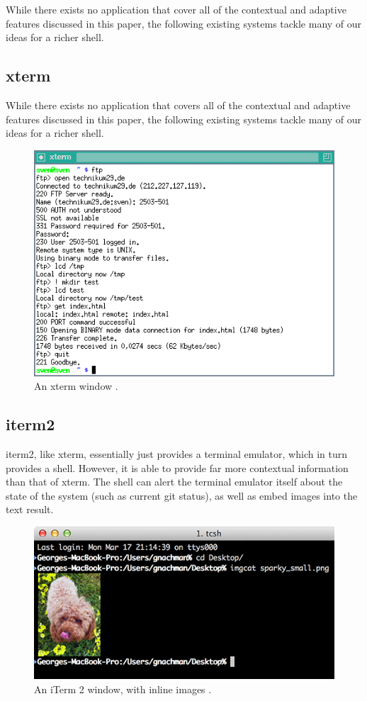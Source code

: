 While there exists no application that cover all of the contextual and adaptive
features discussed in this paper, the following existing systems tackle many of
our ideas for a richer shell.

\subsection{xterm}
While there exists no application that covers all of the contextual and adaptive
features discussed in this paper, the following existing systems tackle many of
our ideas for a richer shell.
\begin{figure}[H]
  \centering
  \includegraphics[width=0.8\linewidth]{figures/existing/xterm.png}
  \caption{An xterm window \cite{sven}.}
  \label{fig:xterm}
\end{figure}

\subsection{iterm2}
iterm2, like xterm, essentially just provides a terminal emulator, which in turn
provides a shell. However, it is able to provide far more contextual information
than that of xterm. The shell can alert the terminal emulator itself about the
state of the system (such as current git status), as well as embed images into
the text result.
\begin{figure}[H]
  \centering
  \includegraphics[width=0.8\linewidth]{figures/existing/iterm2.png}
  \caption{An iTerm 2 window, with inline images \cite{iterm}.}
  \label{fig:iterm}
\end{figure}

